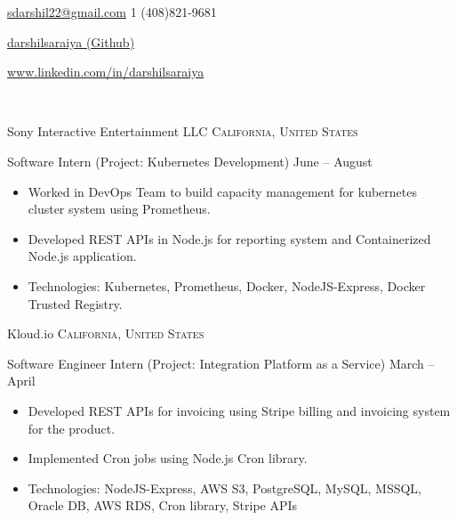 \documentclass[10pt,a4paper]{article}
\begin{document}
\sloppy  %



\nobreakvspace{0.4em}  %

\noindent\href{mailto:sdarshil22.at.gmail.dot.com}{sdarshil22\mbox{}@\mbox{}gmail.com}\sbull
\textsmaller{+}1 (408)821-9681\sbull
{\newnums \href{https://github.com/darshilsaraiya}{darshilsaraiya (Github)}\sbull
{\mewmums \href{https://www.linkedin.com/in/darshilsaraiya/}{www.linkedin.com/in/darshilsaraiya}\sbull
{
\\
{%
}


\spacedhrule{0.0em}{-0.4em}



\headedsection  %
  {Sony Interactive Entertainment LLC}
  {\textsc{California, United States}} {%
  \headedsubsection
    {Software Intern (Project: Kubernetes Development)}
    {June  -- August }
    {\bodytext
    {
    \begin{itemize}
        \item Worked in DevOps Team to build capacity management for kubernetes cluster system using Prometheus. 
        \item Developed REST APIs in Node.js for reporting system and Containerized Node.js application.
        \item Technologies: Kubernetes, Prometheus, Docker, NodeJS-Express, Docker Trusted Registry.
    \end{itemize}}}
}

\headedsection  %
  {Kloud.io}
  {\textsc{California, United States}} {%
  \headedsubsection
    {Software Engineer Intern (Project: Integration Platform as a Service)}
    {March  -- April }
    {\bodytext
    {
    \begin{itemize}
        \item Developed REST APIs for invoicing using Stripe billing and invoicing system for the product.
        \item Implemented Cron jobs using Node.js Cron library.
        \item Technologies: NodeJS-Express, AWS S3, PostgreSQL, MySQL, MSSQL, Oracle DB, AWS RDS, Cron library, Stripe APIs
    \end{itemize}}}
}

}}}
\end{document}
